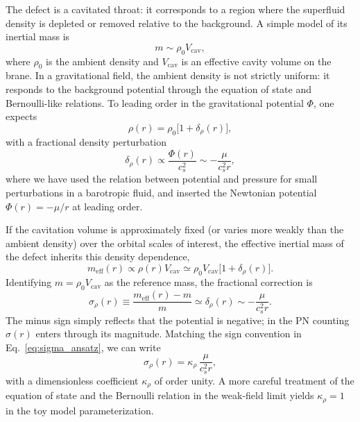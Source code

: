 \documentclass[11pt]{article}
\newcommand{\cS}{c_s}
\begin{document}
The defect is a cavitated throat: it corresponds to a region where the superfluid density is depleted or removed relative to the background. A simple model of its inertial mass is
\begin{equation}
  m \sim \rho_0 V_{\mathrm{cav}},
\end{equation}
where $\rho_0$ is the ambient density and $V_{\mathrm{cav}}$ is an effective cavity volume on the brane. In a gravitational field, the ambient density is not strictly uniform: it responds to the background potential through the equation of state and Bernoulli-like relations. To leading order in the gravitational potential $\Phi$, one expects
\begin{equation}
  \rho(r)
  = \rho_0 \bigl[1 + \delta_\rho(r)\bigr],
\end{equation}
with a fractional density perturbation
\begin{equation}
  \delta_\rho(r) \propto \frac{\Phi(r)}{\cS^2}
  \sim -\frac{\mu}{\cS^2 r},
\end{equation}
where we have used the relation between potential and pressure for small perturbations in a barotropic fluid, and inserted the Newtonian potential $\Phi(r) = -\mu/r$ at leading order.

If the cavitation volume is approximately fixed (or varies more weakly than the ambient density) over the orbital scales of interest, the effective inertial mass of the defect inherits this density dependence,
\begin{equation}
  m_{\mathrm{eff}}(r)
  \propto \rho(r) V_{\mathrm{cav}}
  \simeq \rho_0 V_{\mathrm{cav}}\bigl[1 + \delta_\rho(r)\bigr].
\end{equation}
Identifying $m = \rho_0 V_{\mathrm{cav}}$ as the reference mass, the fractional correction is
\begin{equation}
  \sigma_\rho(r) \equiv \frac{m_{\mathrm{eff}}(r) - m}{m}
  \simeq \delta_\rho(r)
  \sim -\frac{\mu}{\cS^2 r}.
\end{equation}
The minus sign simply reflects that the potential is negative; in the PN counting $\sigma(r)$ enters through its magnitude. Matching the sign convention in Eq.~\eqref{eq:sigma_ansatz}, we can write
\begin{equation}
  \sigma_\rho(r)
  = \kappa_\rho\,\frac{\mu}{\cS^2 r},
\end{equation}
with a dimensionless coefficient $\kappa_\rho$ of order unity. A more careful treatment of the equation of state and the Bernoulli relation in the weak-field limit yields $\kappa_\rho = 1$ in the toy model parameterization.
\end{document}
